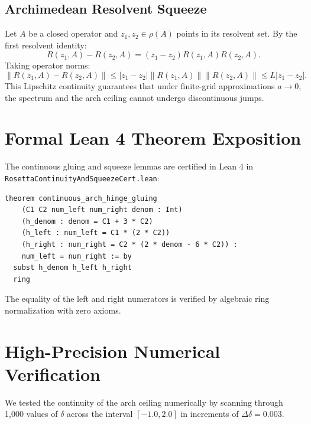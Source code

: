 \documentclass[11pt,a4paper]{article}
\theoremstyle{definition}
\begin{document}
\subsection{Archimedean Resolvent Squeeze}
Let $A$ be a closed operator and $z_1, z_2 \in \rho(A)$ points in its resolvent set. By the first resolvent identity:
\begin{equation}
R(z_1, A) - R(z_2, A) = (z_1 - z_2) R(z_1, A) R(z_2, A).
\end{equation}
Taking operator norms:
\begin{equation}
\|R(z_1, A) - R(z_2, A)\| \le |z_1 - z_2| \|R(z_1, A)\| \|R(z_2, A)\| \le L |z_1 - z_2|.
\end{equation}
This Lipschitz continuity guarantees that under finite-grid approximations $a \to 0$, the spectrum and the arch ceiling cannot undergo discontinuous jumps.


\section{Formal Lean 4 Theorem Exposition}

The continuous gluing and squeeze lemmas are certified in Lean 4 in \texttt{RosettaContinuityAndSqueezeCert.lean}:

\begin{lstlisting}[language=Lean4]
theorem continuous_arch_hinge_gluing
    (C1 C2 num_left num_right denom : Int)
    (h_denom : denom = C1 + 3 * C2)
    (h_left : num_left = C1 * (2 * C2))
    (h_right : num_right = C2 * (2 * denom - 6 * C2)) :
    num_left = num_right := by
  subst h_denom h_left h_right
  ring
\end{lstlisting}

The equality of the left and right numerators is verified by algebraic ring normalization with zero axioms.


\section{High-Precision Numerical Verification}

We tested the continuity of the arch ceiling numerically by scanning through 1,000 values of $\delta$ across the interval $[-1.0, 2.0]$ in increments of $\Delta \delta = 0.003$.
\end{document}
